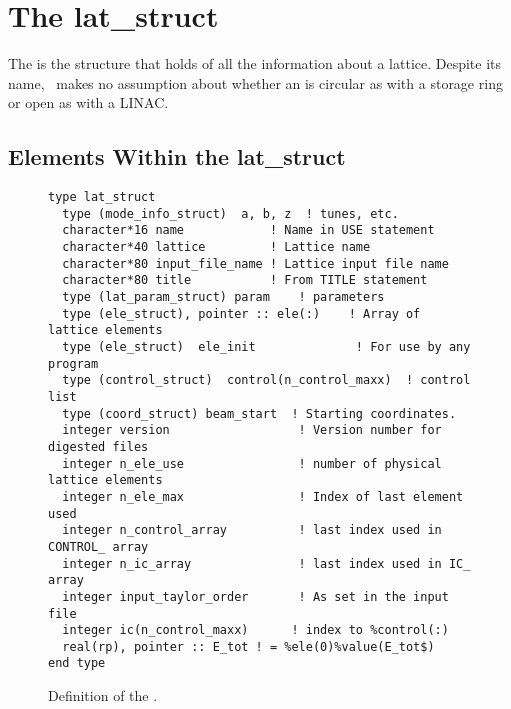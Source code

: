 \chapter{The lat_struct}
\label{c:lat.struct}

The  is the structure that holds of all the information 
about a lattice.   Despite its name, \bmad\
makes no assumption about whether an  is circular as
with a storage ring or open as with a LINAC.

\section{Elements Within the lat_struct}
\label {s:lat.struct}

\begin{figure}[htb]
\centering
\begin{verbatim}
type lat_struct
  type (mode_info_struct)  a, b, z  ! tunes, etc.
  character*16 name            ! Name in USE statement
  character*40 lattice         ! Lattice name
  character*80 input_file_name ! Lattice input file name
  character*80 title           ! From TITLE statement
  type (lat_param_struct) param    ! parameters
  type (ele_struct), pointer :: ele(:)    ! Array of lattice elements
  type (ele_struct)  ele_init              ! For use by any program
  type (control_struct)  control(n_control_maxx)  ! control list
  type (coord_struct) beam_start  ! Starting coordinates.
  integer version                  ! Version number for digested files
  integer n_ele_use                ! number of physical lattice elements
  integer n_ele_max                ! Index of last element used
  integer n_control_array          ! last index used in CONTROL_ array
  integer n_ic_array               ! last index used in IC_ array
  integer input_taylor_order       ! As set in the input file
  integer ic(n_control_maxx)      ! index to %control(:)
  real(rp), pointer :: E_tot ! = %ele(0)%value(E_tot$)
end type
\end{verbatim}
\caption{Definition of the .}
\label{f:lat.struct}
\end{figure}

